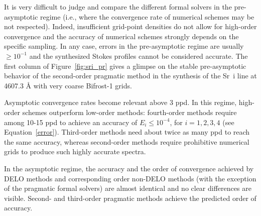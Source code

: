 \documentclass[iop,numberedappendix,twocolappendix,twocolumn]{emulateapj}
\begin{document}
It is very difficult to judge and compare the different formal solvers in the pre-asymptotic regime (i.e., where the convergence rate of numerical schemes may be not respected). 
Indeed, insufficient grid-point densities do not allow for high-order convergence and the accuracy of numerical schemes strongly depends on the specific sampling.
In any case, errors in the pre-asymptotic regime are usually $\ge10^{-1}$ and the synthesized Stokes profiles cannot be considered accurate.
The first column of Figure~\ref{fig:sri_pr} gives a glimpse on the stable pre-asymptotic behavior of the second-order pragmatic method in
the synthesis of the Sr~{\sc i} line at 4607.3 {\rm \AA} with very coarse Bifrost-1 grids.

Asymptotic convergence rates become relevant above 3 ppd.
In this regime, high-order schemes outperform low-order methods:
fourth-order methods require among 10-15 ppd to achieve an accuracy of $E_i\le10^{-4}$, for $i=1,2,3,4$ (see Equation~\eqref{error}).
Third-order methods need about twice as many ppd to reach the same accuracy,
whereas second-order methods require prohibitive numerical grids to produce such highly accurate spectra.

In the asymptotic regime, the accuracy and the order of convergence achieved by DELO methods 
and corresponding order non-DELO methods (with the exception of the pragmatic formal solvers) are almost identical and no clear differences are visible.
Second- and third-order pragmatic methods achieve the predicted order of accuracy.
%
\end{document}

